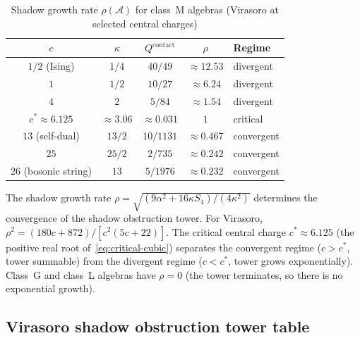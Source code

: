 \documentclass[11pt]{article}
\theoremstyle{plain}
\theoremstyle{definition}
\theoremstyle{remark}
\providecommand{\cA}{\mathcal{A}}
\begin{document}
\begin{table}[ht]
\centering
\caption{Shadow growth rate $\rho(\cA)$ for class~M algebras
(Virasoro at selected central charges)}
\label{tab:growth-rate}
\renewcommand{\arraystretch}{1.35}
{\small
\begin{tabular}{ccccl}
\toprule
$c$
 & $\kappa$
 & $Q^{\mathrm{contact}}$
 & $\rho$
 & \textbf{Regime} \\
\midrule
$1/2$ (Ising)
 & $1/4$ & $40/49$ & $\approx 12.53$ & divergent \\
$1$
 & $1/2$ & $10/27$ & $\approx 6.24$ & divergent \\
$4$
 & $2$ & $5/84$ & $\approx 1.54$ & divergent \\
$c^* \approx 6.125$
 & $\approx 3.06$ & $\approx 0.031$ & $1$ & critical \\
$13$ (self-dual)
 & $13/2$ & $10/1131$ & $\approx 0.467$ & convergent \\
$25$
 & $25/2$ & $2/735$ & $\approx 0.242$ & convergent \\
$26$ (bosonic string)
 & $13$ & $5/1976$ & $\approx 0.232$ & convergent \\
\bottomrule
\end{tabular}
}
\end{table}

\noindent
The shadow growth rate $\rho = \sqrt{(9\alpha^2 + 16\kappa S_4)/(4\kappa^2)}$
determines the convergence of the shadow obstruction tower. For Virasoro,
$\rho^2 = (180c + 872)/[c^2(5c+22)]$. The critical central charge
$c^* \approx 6.125$ (the positive real root of~\eqref{eq:critical-cubic})
separates the convergent regime ($c > c^*$, tower summable) from the
divergent regime ($c < c^*$, tower grows exponentially). Class~G and
class~L algebras have $\rho = 0$ (the tower terminates, so there is no
exponential growth).

\subsection{Virasoro shadow obstruction tower table}\label{ssec:virasoro-tower-table}
\end{document}
